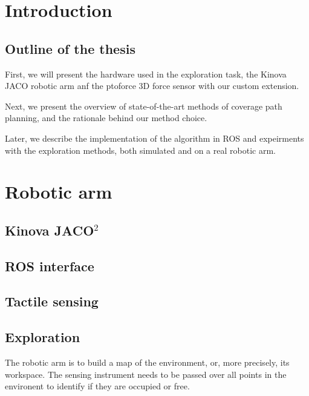 \documentclass[twoside]{ctuthesis}
\theoremstyle{plain}
\theoremstyle{definition}
\theoremstyle{note}
\begin{document}
\maketitle

\chapter{Introduction}
\label{chap:intro}

\section{Outline of the thesis}
\label{sec:outline}

First, we will present the hardware used in the exploration task, the Kinova JACO robotic arm anf the ptoforce 3D force sensor with our custom extension.

Next, we present the overview of state-of-the-art methods of coverage path planning, and the rationale behind our method choice.

Later, we describe the implementation of the algorithm in ROS and expeirments with the exploration methods, both simulated and on a real robotic arm.


\chapter{Robotic arm}

\section{Kinova JACO\(^2\)}

\section{ROS interface}

\section{Tactile sensing}

\section{Exploration}

The robotic arm is to build a map of the environment, or, more precisely, its workspace. The sensing instrument needs to be passed over all points in the environent to identify if they are occupied or free.
\end{document}
